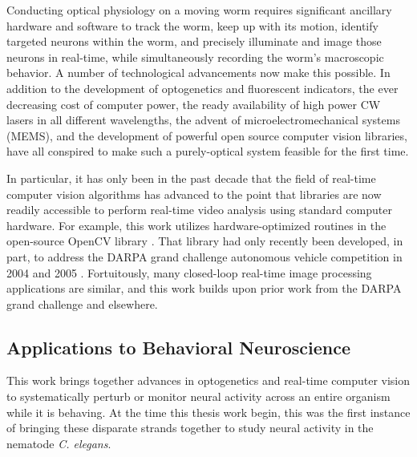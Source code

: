 Conducting optical physiology on a moving worm requires significant ancillary hardware and software to track the worm, keep up with its motion, identify targeted neurons within the worm, and precisely illuminate and image those neurons in real-time, while simultaneously recording the worm's macroscopic behavior. 
A number of technological advancements now make this possible. In addition to the development of optogenetics and fluorescent indicators, the ever decreasing cost of computer power, the ready availability of high power CW lasers in all different wavelengths,  the advent of microelectromechanical systems (MEMS), and the development of powerful open source computer vision libraries, have  all conspired to make such a purely-optical system feasible for the first time. 

In particular, it has only been in the past decade that the field of real-time computer vision algorithms has advanced to the point that libraries are now readily accessible to  perform real-time video analysis using standard computer hardware. For example, this work utilizes hardware-optimized routines in the open-source OpenCV library \citep{bradski_opencv_2000,bradski_learning_2008}. That library had only recently been developed, in part, to address the DARPA grand challenge autonomous vehicle competition in 2004 and 2005  \citep{stavens_learning_2011,buehler_stanley:_2007}. Fortuitously, many closed-loop real-time image processing applications are similar, and this work builds upon prior work from the DARPA grand challenge and elsewhere.



\subsection{Applications to Behavioral Neuroscience}


This work brings together advances in optogenetics and real-time computer vision to systematically perturb or monitor neural activity across an entire organism while it is behaving.  At the time this thesis work begin, this was the first instance of bringing these disparate strands together to study  neural activity in the nematode \textit{C. elegans}.

